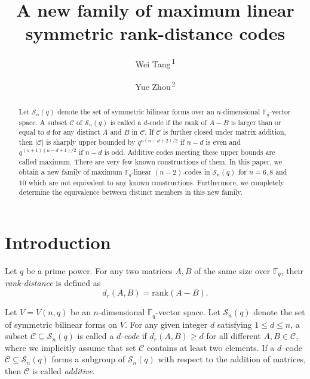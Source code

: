 \documentclass{amsart}
\theoremstyle{plain}
\theoremstyle{definition}
\newcommand{\F}{\mathbb F}
\newcommand{\fq}{\mathbb{F}_{q}}
\newcommand{\rank}{\mathrm{rank}}
\newcommand{\cC}{\mathcal C}
\newcommand{\sS}{\mathscr S}
\begin{document}
	\title[New maximum linear symmetric rank-distance codes]{A new family of maximum linear symmetric rank-distance codes}
	\author[W. Tang]{Wei Tang\textsuperscript{\,1}}
	\author[Y. Zhou]{Yue Zhou\textsuperscript{\,2}}
	\address{\textsuperscript{1}Purple Mountain Laborotories, 211111 Nanjing, China}
	\address{\textsuperscript{2}Department of Mathematics, National University of Defense Technology, 410073 Changsha, China}
	\begin{abstract}
		Let $\mathscr{S}_n(q)$ denote the set of symmetric bilinear forms over an $n$-dimensional $\fq$-vector space. A subset $\mathcal{C}$ of $\mathscr{S}_n(q)$ is called a $d$-code if the rank of $A-B$ is larger than or equal to $d$ for any distinct $A$ and $B$ in $\mathcal{C}$. If $\mathcal{C}$ is further closed under matrix addition, then $|\mathcal{C}|$ is sharply upper bounded by $q^{n(n-d+2)/2}$ if $n-d$ is even and $q^{(n+1)(n-d+1)/2}$ if $n-d$ is odd. Additive codes meeting these upper bounds are called maximum. There are very few known constructions of them. In this paper, we obtain a new family of maximum $\fq$-linear $(n-2)$-codes in $\mathscr{S}_n(q)$ for $n=6,8$ and $10$ which are not equivalent to any known constructions. Furthermore, we completely determine the equivalence between distinct members in this new family.
	\end{abstract}
	\maketitle
	
	\section{Introduction}\label{sec:intro}
	Let $q$ be a prime power.  For any two matrices $A, B$ of the same size over $\F_q$, their \emph{rank-distance} is defined as 
	\[d_r(A,B)=\rank(A-B).\]
	
	Let $V=V(n,q)$ be an $n$-dimensional $\fq$-vector space. Let $\sS_n(q)$ denote the set of symmetric bilinear forms on $V$.
	For any given integer $d$ satisfying $1\leq d\leq n$, a subset $\cC \subseteq \sS_n(q)$ is called a \emph{$d$-code} if
	$d_r(A, B)\geq d$ for all different $A, B \in \cC$, where we implicitly assume that set $\cC$ contains at least two elements. If a $d$–code $\cC \subseteq \sS_n(q)$ forms a subgroup of $\sS_n(q)$ with respect to the addition of matrices, then $\cC$ is called \emph{additive}. 
	
\end{document}
